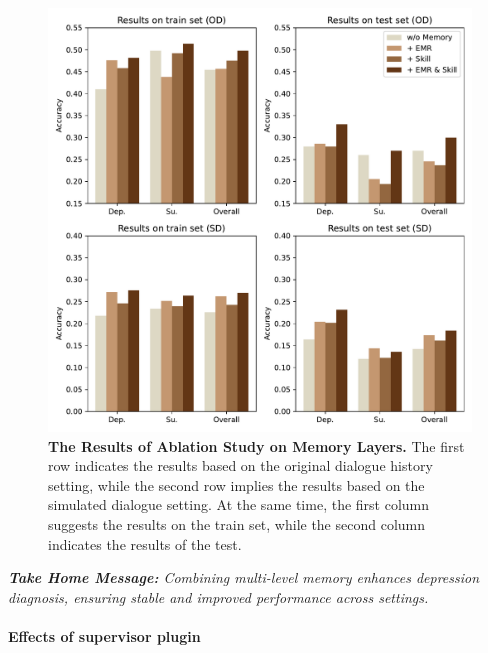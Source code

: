 \begin{figure}[!t]
    \centering
    \includegraphics[width=1\linewidth]{fig/experiments_memory_new.pdf}
    \caption{\textbf{The Results of Ablation Study on Memory Layers.} The first row indicates the results based on the original dialogue history setting, while the second row implies the results based on the simulated dialogue setting. At the same time, the first column suggests the results on the train set, while the second column indicates the results of the test.}
    \label{fig:exp}
\end{figure}

\textit{\textbf{Take Home Message: } Combining multi-level memory enhances depression diagnosis, ensuring stable and improved performance across settings.}


\paragraph{Effects of supervisor plugin}


